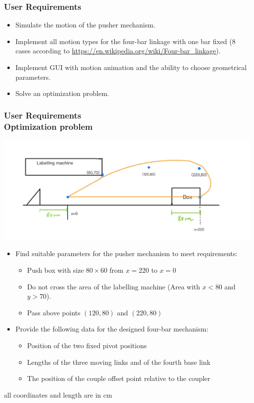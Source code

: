 \documentclass[ucs,10pt]{beamer}
\begin{document}
\begin{frame}
\frametitle{User Requirements}
    \begin{itemize}
        \item Simulate the motion of the pusher mechanism.
        \item Implement all motion types for the four-bar linkage with one bar fixed (8 cases according to \url{https://en.wikipedia.org/wiki/Four-bar_linkage}).
        \item Implement GUI with motion animation and the ability to choose geometrical parameters.
        \item Solve an optimization problem.
    \end{itemize}
\end{frame}


\begin{frame}
\frametitle{User Requirements \\
	\small \color{rwth-blue} Optimization problem}
        \begin{center}
            \includegraphics[width=0.75\linewidth]{./Used_Picture/Example_1.jpg}
        \end{center}
	\begin{itemize}
        \item Find suitable parameters for the pusher mechanism to meet requirements:
            \begin{itemize}
                \item Push box with size $80\times60$ from $x=220$ to $x=0$
                \item Do not cross the area of the labelling machine (Area with $x<80$ and $y>70$).
                \item Pass above points $(120, 80)$ and $(220, 80)$
            \end{itemize}
        \item Provide the following data for the designed four-bar mechanism:
            \begin{itemize}
                \item Position of the two fixed pivot positions
                \item Lengths of the three moving links and of the fourth base link
                \item The position of the couple offset point relative to the coupler
            \end{itemize}
	\end{itemize}
        {\small *all coordinates and length are in cm}
\end{frame}
\end{document}
